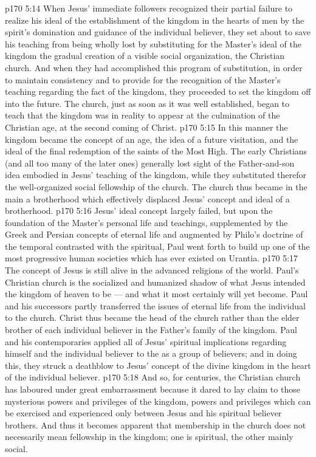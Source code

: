 \vs p170 5:14 When Jesus’ immediate followers recognized their partial failure to realize his ideal of the establishment of the kingdom in the hearts of men by the spirit’s domination and guidance of the individual believer, they set about to save his teaching from being wholly lost by substituting for the Master’s ideal of the kingdom the gradual creation of a visible social organization, the Christian church. And when they had accomplished this program of substitution, in order to maintain consistency and to provide for the recognition of the Master’s teaching regarding the fact of the kingdom, they proceeded to set the kingdom off into the future. The church, just as soon as it was well established, began to teach that the kingdom was in reality to appear at the culmination of the Christian age, at the second coming of Christ.
\vs p170 5:15 In this manner the kingdom became the concept of an age, the idea of a future visitation, and the ideal of the final redemption of the saints of the Most High. The early Christians (and all too many of the later ones) generally lost sight of the Father\hyp{}and\hyp{}son idea embodied in Jesus’ teaching of the kingdom, while they substituted therefor the well\hyp{}organized social fellowship of the church. The church thus became in the main a  brotherhood which effectively displaced Jesus’ concept and ideal of a  brotherhood.
\vs p170 5:16 Jesus’ ideal concept largely failed, but upon the foundation of the Master’s personal life and teachings, supplemented by the Greek and Persian concepts of eternal life and augmented by Philo’s doctrine of the temporal contrasted with the spiritual, Paul went forth to build up one of the most progressive human societies which has ever existed on Urantia.
\vs p170 5:17 The concept of Jesus is still alive in the advanced religions of the world. Paul’s Christian church is the socialized and humanized shadow of what Jesus intended the kingdom of heaven to be --- and what it most certainly will yet become. Paul and his successors partly transferred the issues of eternal life from the individual to the church. Christ thus became the head of the church rather than the elder brother of each individual believer in the Father’s family of the kingdom. Paul and his contemporaries applied all of Jesus’ spiritual implications regarding himself and the individual believer to the  as a group of believers; and in doing this, they struck a deathblow to Jesus’ concept of the divine kingdom in the heart of the individual believer.
\vs p170 5:18 And so, for centuries, the Christian church has laboured under great embarrassment because it dared to lay claim to those mysterious powers and privileges of the kingdom, powers and privileges which can be exercised and experienced only between Jesus and his spiritual believer brothers. And thus it becomes apparent that membership in the church does not necessarily mean fellowship in the kingdom; one is spiritual, the other mainly social.
